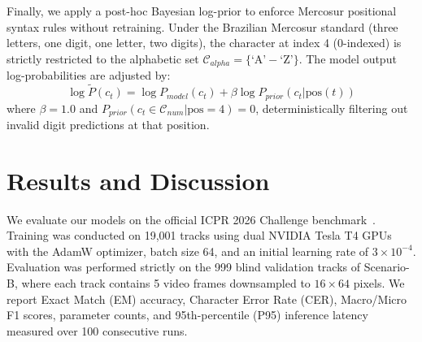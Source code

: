 \documentclass[sigconf]{acmart}
\begin{document}
Finally, we apply a post-hoc Bayesian log-prior to enforce Mercosur positional syntax rules without retraining. Under the Brazilian Mercosur standard (three letters, one digit, one letter, two digits), the character at index 4 (0-indexed) is strictly restricted to the alphabetic set $\mathcal{C}_{alpha} = \{\text{`A'}-\text{`Z'}\}$. The model output log-probabilities are adjusted by:
\begin{equation}
\log \tilde{P}(c_t) = \log P_{model}(c_t) + \beta \log P_{prior}(c_t | \text{pos}(t))
\label{eq:bayesian_prior}
\end{equation}
where $\beta = 1.0$ and $P_{prior}(c_t \in \mathcal{C}_{num} | \text{pos} = 4) = 0$, deterministically filtering out invalid digit predictions at that position.

\section{Results and Discussion}
\label{sec:results}

We evaluate our models on the official ICPR 2026 Challenge benchmark~\cite{icpr2026lrlpr}. Training was conducted on 19,001 tracks using dual NVIDIA Tesla T4 GPUs with the AdamW optimizer, batch size 64, and an initial learning rate of $3 \times 10^{-4}$. Evaluation was performed strictly on the 999 blind validation tracks of Scenario-B, where each track contains 5 video frames downsampled to $16 \times 64$ pixels. We report Exact Match (EM) accuracy, Character Error Rate (CER), Macro/Micro F1 scores, parameter counts, and 95th-percentile (P95) inference latency measured over 100 consecutive runs.
\end{document}
